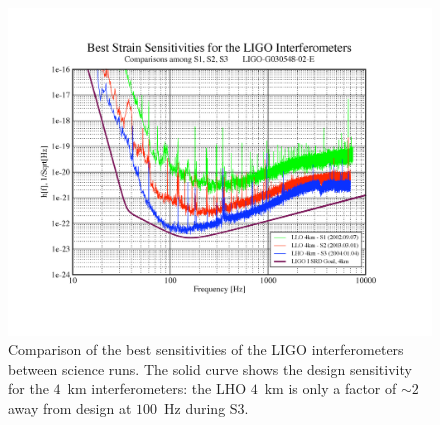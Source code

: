 \newpage 

\begin{figure}[p]
\label{f:s3strain}
\vspace{5pt}
\begin{center}
\includegraphics[width=\textwidth]{figures/conclusion/s3strain}
\end{center}
\caption[Comparison of Best LIGO Interferometer Sensitivity]{%
Comparison of the best sensitivities of the LIGO interferometers between
science runs. The solid curve shows the design sensitivity for the $4$~km
interferometers: the LHO $4$~km is only a factor of $\sim 2$ away from design
at $100$~Hz during S3.
}
\end{figure}

